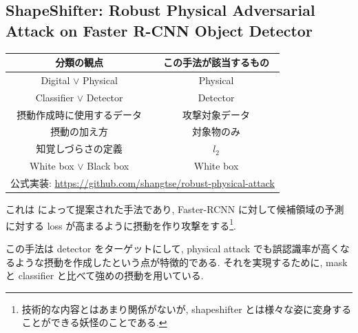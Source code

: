 \subsection{ShapeShifter: Robust Physical Adversarial Attack on Faster R-CNN Object Detector}
\label{subsec:shapeshifter}
%
\begin{table}[htbp]
\begin{center}
\begin{tabular}{|c|c|}
\hline
分類の観点 & この手法が該当するもの \\
\hline
Digital $\lor$ Physical & Physical \\
Classifier $\lor$ Detector & Detector \\
摂動作成時に使用するデータ & 攻撃対象データ \\
摂動の加え方 & 対象物のみ \\
知覚しづらさの定義 & $l_2$ \\
White box $\lor$ Black box & White box \\
\hline
\multicolumn{2}{|c|}{公式実装: \href{https://github.com/shangtse/robust-physical-attack}{https://github.com/shangtse/robust-physical-attack}} \\
\hline
\end{tabular}
\label{tb:shapeshifter-summary}
\end{center}
\end{table}
%

これは \cite{chen2018shapeshifter} によって提案された手法であり, Faster-RCNN に対して候補領域の予測に対する loss が高まるように摂動を作り攻撃をする\footnote{
技術的な内容とはあまり関係がないが, shapeshifter とは様々な姿に変身することができる妖怪のことである.
}.

この手法は detector をターゲットにして, physical attack でも誤認識率が高くなるような摂動を作成したという点が特徴的である.
それを実現するために, mask と classifier と比べて強めの摂動を用いている.

